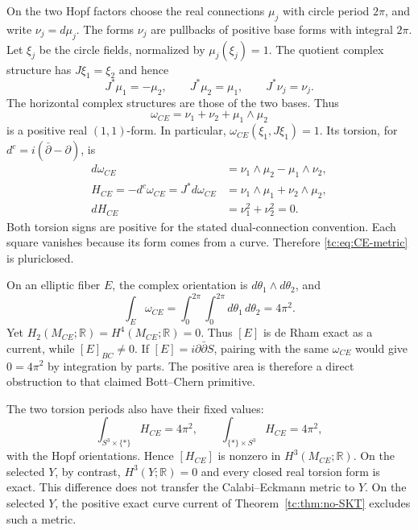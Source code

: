 On the two Hopf factors choose the real connections $\mu_j$
with circle period $2\pi$, and write $\nu_j=d\mu_j$.
The forms $\nu_j$ are pullbacks of positive base forms with
integral $2\pi$.
Let $\xi_j$ be the circle fields, normalized by
$\mu_j(\xi_j)=1$.
The quotient complex structure has $J\xi_1=\xi_2$ and hence
\[
 J^*\mu_1=-\mu_2,\qquad J^*\mu_2=\mu_1,
 \qquad J^*\nu_j=\nu_j.
\]
The horizontal complex structures are those of the two bases.
Thus
\begin{equation}\label{tc:eq:CE-metric}
                  \omega_{CE}=\nu_1+\nu_2+\mu_1\wedge\mu_2
\end{equation}
is a positive real $(1,1)$-form. In particular,
$\omega_{CE}(\xi_1,J\xi_1)=1$.
Its torsion, for $d^c=i(\bar\partial-\partial)$, is
\begin{equation}\label{tc:eq:CE-torsion}
 \begin{aligned}
 d\omega_{CE}&=\nu_1\wedge\mu_2-\mu_1\wedge\nu_2,\\
 H_{CE}=-d^c\omega_{CE}=J^*d\omega_{CE}
               &=\nu_1\wedge\mu_1+\nu_2\wedge\mu_2,\\
 dH_{CE}&=\nu_1^2+\nu_2^2=0.
 \end{aligned}
\end{equation}
Both torsion signs are positive for the stated dual-connection
convention. Each square vanishes because its form comes from
a curve. Therefore \eqref{tc:eq:CE-metric} is pluriclosed.

On an elliptic fiber $E$, the complex orientation is
$d\theta_1\wedge d\theta_2$, and
\begin{equation}\label{tc:eq:CE-area}
 \int_E\omega_{CE}
    =\int_0^{2\pi}\int_0^{2\pi}d\theta_1\,d\theta_2
    =4\pi^2.
\end{equation}
Yet $H_2(M_{CE};\mathbb R)=H^4(M_{CE};\mathbb R)=0$.
Thus $[E]$ is de Rham exact as a current, while
$[E]_{BC}\ne0$.
If $[E]=i\partial\bar\partial S$, pairing with the same
$\omega_{CE}$ would give $0=4\pi^2$ by integration by parts.
The positive area is therefore a direct obstruction to that
claimed Bott--Chern primitive.

The two torsion periods also have their fixed values:
\[
 \int_{S^3\times\{*\}}H_{CE}=4\pi^2,
 \qquad
 \int_{\{*\}\times S^3}H_{CE}=4\pi^2,
\]
with the Hopf orientations. Hence $[H_{CE}]$ is nonzero in
$H^3(M_{CE};\mathbb R)$.
On the selected $Y$, by contrast, $H^3(Y;\mathbb R)=0$ and
every closed real torsion form is exact.
This difference does not transfer the Calabi--Eckmann metric
to $Y$. On the selected $Y$, the positive exact curve current
of Theorem~\ref{tc:thm:no-SKT} excludes such a metric.
